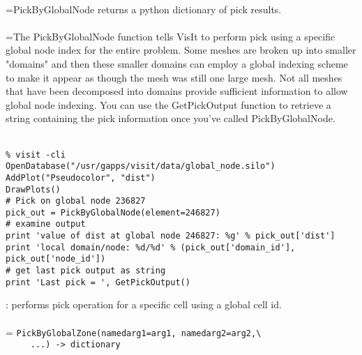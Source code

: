 \documentclass[10pt,a4paper]{report}
\begin{document}
 \\ 
\hangindent=\parindent PickByGlobalNode returns a python dictionary of pick results. \\[-3mm] 

 \\ 
\hangindent=\parindent The PickByGlobalNode function tells VisIt to perform pick using a specific global node index for the entire problem. Some meshes are broken up into smaller "domains" and then these smaller domains can employ a global indexing scheme to make it appear as though the mesh was still one large mesh. Not all meshes that have been decomposed into domains provide sufficient information to allow global node indexing. You can use the GetPickOutput function to retrieve a string containing the pick information once you've called PickByGlobalNode. \\[-3mm] 

\\[-6mm]
\begin{verbatim}% visit -cli
OpenDatabase("/usr/gapps/visit/data/global_node.silo")
AddPlot("Pseudocolor", "dist")
DrawPlots()
# Pick on global node 236827
pick_out = PickByGlobalNode(element=246827)
# examine output
print 'value of dist at global node 246827: %g' % pick_out['dist']
print 'local domain/node: %d/%d' % (pick_out['domain_id'], pick_out['node_id'])
# get last pick output as string
print 'Last pick = ', GetPickOutput()
\end{verbatim}
\newpage


{}
: performs pick operation for a specific cell using a global cell id.\\[-3mm]

 \\ 
\hangindent=\parindent
\verb!PickByGlobalZone(namedarg1=arg1, namedarg2=arg2,\ ! \\ 
\verb!     ...) -> dictionary!\\ [-3mm]
\end{document}
